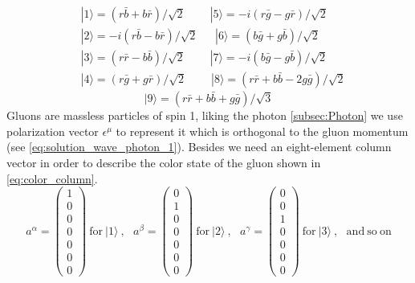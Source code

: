 \begin{equation}
\begin{split}
&|1\rangle=(r\bar{b}+b\bar{r})/\sqrt{2}~~~~~~~~~~|5\rangle=-i(r\bar{g}-g\bar{r})/\sqrt{2} \\
&|2\rangle=-i(r\bar{b}-b\bar{r})/\sqrt{2}~~~~~~~|6\rangle=(b\bar{g}+g\bar{b})/\sqrt{2} \\
&|3\rangle=(r\bar{r}-b\bar{b})/\sqrt{2}~~~~~~~~~~|7\rangle=-i(b\bar{g}-g\bar{b})/\sqrt{2} \\
&|4\rangle=(r\bar{g}+g\bar{r})/\sqrt{2}~~~~~~~~~~|8\rangle=(r\bar{r}+b\bar{b}-2g\bar{g})/\sqrt{2}
\end{split}
\label{eq:color_octet}
\end{equation}
\begin{equation}
|9\rangle=(r\bar{r}+b\bar{b}+g\bar{g})/\sqrt{3}
\label{eq:color_singlet}
\end{equation}
Gluons are massless particles of spin 1, liking the photon \ref{subsec:Photon} we use polarization vector $\epsilon^{\mu}$ to represent it which is orthogonal to the gluon momentum (see \ref{eq:solution_wave_photon_1}). Besides we need an eight-element column vector in order to describe the color state of the gluon shown in \ref{eq:color_column}.
\begin{equation}
a^{\alpha}=\begin{pmatrix} 1\\0\\0\\0\\0\\0\\0 \end{pmatrix}~\mathrm{for~|1\rangle~},~~~a^{\beta}=\begin{pmatrix} 0\\1\\0\\0\\0\\0\\0 \end{pmatrix}~\mathrm{for~|2\rangle~},~~~a^{\gamma}=\begin{pmatrix} 0\\0\\1\\0\\0\\0\\0 \end{pmatrix}~\mathrm{for~|3\rangle~},~~~\mathrm{and~so~on}
\label{eq:color_column}
\end{equation}


